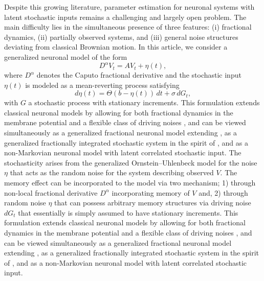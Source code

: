 \documentclass[11pt,reqno,oneside, a4paper]{amsart}
\numberwithin{equation}{section}
\theoremstyle{remark}
\begin{document}
Despite this growing literature, parameter estimation for neuronal systems with latent stochastic inputs remains a challenging and largely open problem. The main difficulty lies in the simultaneous presence of three features: (i) fractional dynamics, (ii) partially observed systems, and (iii) general noise structures deviating from classical Brownian motion.
In this article, we consider a generalized neuronal model of the form
$$
D^\alpha V_t = A V_t + \eta(t),
$$
where $D^\alpha$ denotes the Caputo fractional derivative and the stochastic input $\eta(t)$  is modeled as a mean-reverting process satisfying
\[
d\eta(t) = \Theta(b-\eta(t))\,dt + \sigma\,dG_t,
\]
with $G$ a stochastic process with stationary increments. This formulation extends classical neuronal models by allowing for both fractional dynamics in the membrane potential and a flexible class of driving noises \cite{Pirozzi2024b}, and can be viewed simultaneously as a generalized fractional neuronal model extending \cite{Pirozzi2018,Pirozzi2024b}, as a generalized fractionally integrated stochastic system in the spirit of \cite{AbundoPirozzi2021,Pirozzi2024}, and as a non-Markovian neuronal model with latent correlated stochastic input. The stochasticity arises from the generalized Ornstein--Uhlenbeck model for the noise $\eta$ that acts as the random noise for the system describing observed $V$. The memory effect can be incorporated to the model via two mechanism; 1) through non-local fractional derivative $D^\alpha$ incorporating memory of $V$ and, 2) through random noise $\eta$ that can possess arbitrary memory structures via driving noise $dG_t$ that essentially is simply assumed to have stationary increments.  This formulation extends classical neuronal models by allowing for both fractional dynamics in the membrane potential and a flexible class of driving noises \cite{Pirozzi2024b}, and can be viewed simultaneously as a generalized fractional neuronal model extending \cite{Pirozzi2018,Pirozzi2024b}, as a generalized fractionally integrated stochastic system in the spirit of \cite{AbundoPirozzi2021,Pirozzi2024}, and as a non-Markovian neuronal model with latent correlated stochastic input.
\end{document}
